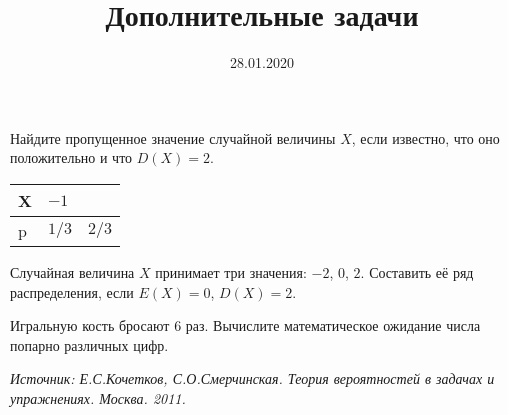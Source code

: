\documentclass[a4paper, 12pt]{article}
\title{Дополнительные задачи}
\date{28.01.2020}
\begin{document}
\begin{problem}
Найдите пропущенное значение случайной величины $X$, 
если известно, что оно положительно и что $D(X)=2$.
\begin{table}[ht!]
\centering
\begin{tabular}{|l|l|l|}
\hline
X & $-1$            &               \\ \hline
p & $1/3$ & $2/3$ \\ \hline
\end{tabular}
\end{table}
\end{problem}

\begin{problem}
Случайная величина $X$ принимает три значения: $-2$, $0$, $2$. 
Составить её ряд распределения, если $E(X) = 0$, $D(X) = 2$. 
\end{problem}

\begin{problem}
Игральную кость бросают $6$ раз. Вычислите математическое 
ожидание числа попарно различных цифр.
\end{problem}

\noindent\textit{Источник: Е.С.Кочетков, С.О.Смерчинская. Теория вероятностей в задачах и упражнениях. Москва. 2011.}
\end{document}
